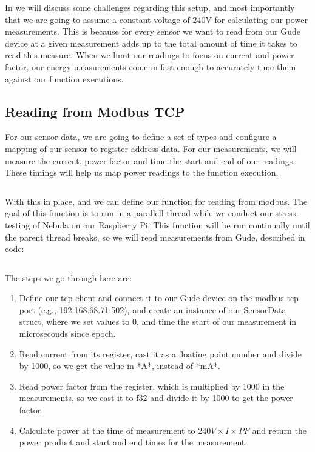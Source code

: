\documentclass[
  table]{report}
\begin{document}
In  we will discuss some challenges
regarding this setup, and most importantly that we are going to assume a
constant voltage of 240V for calculating our power measurements. This is
because for every sensor we want to read from our Gude device at a given
measurement adds up to the total amount of time it takes to read this
measure. When we limit our readings to focus on current and power
factor, our energy measurements come in fast enough to accurately time
them against our function executions.

\subsection{Reading from Modbus TCP}
\label{sect:read_modbus}

For our sensor data, we are going to define a set of types and configure
a mapping of our sensor to register address data. For our measurements,
we will measure the current, power factor and time the start and end of
our readings. These timings will help us map power readings to the
function execution.

\inputminted[firstline = 33, lastline = 60]{rust}{assets/code/modbus.rs}

With this in place, and we can define our function for reading from
modbus. The goal of this function is to run in a parallell thread while
we conduct our stress-testing of Nebula on our Raspberry Pi. This
function will be run continually until the parent thread breaks, so we
will read measurements from Gude, described in code:

\inputminted[firstline = 0, lastline = 31]{rust}{assets/code/modbus.rs}

The steps we go through here are:

\renewcommand{\theenumi}{5.\arabic{enumi}}
\begin{enumerate}
  \item Define our tcp client and connect it to our Gude device on the modbus tcp port (e.g., 192.168.68.71:502), and create an instance of our SensorData struct, where we set values to 0, and time the start of our measurement in microseconds since epoch.
  \item Read current from its register, cast it as a floating point number and divide by 1000, so we get the value in *A*, instead of *mA*.
  \item Read power factor from the register, which is multiplied by 1000 in the measurements, so we cast it to f32 and divide it by 1000 to get the power factor.
  \item Calculate power at the time of measurement to \(240V \times I \times PF\) and return the power product and start and end times for the measurement.
\end{enumerate}
\end{document}
